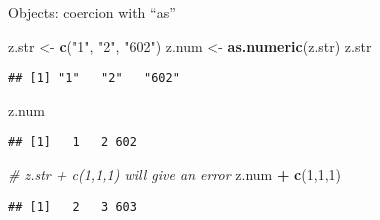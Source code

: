 \documentclass[ignorenonframetext,]{beamer}
\newenvironment{Shaded}{\begin{snugshade}}{\end{snugshade}}
\newcommand{\KeywordTok}[1]{\textcolor[rgb]{0.13,0.29,0.53}{\textbf{#1}}}
\newcommand{\DecValTok}[1]{\textcolor[rgb]{0.00,0.00,0.81}{#1}}
\newcommand{\StringTok}[1]{\textcolor[rgb]{0.31,0.60,0.02}{#1}}
\newcommand{\CommentTok}[1]{\textcolor[rgb]{0.56,0.35,0.01}{\textit{#1}}}
\newcommand{\OperatorTok}[1]{\textcolor[rgb]{0.81,0.36,0.00}{\textbf{#1}}}
\newcommand{\NormalTok}[1]{#1}
\begin{document}
\begin{frame}[fragile]{Objects: coercion with ``as''}

\begin{Shaded}
\begin{Highlighting}[]
\NormalTok{z.str <-}\StringTok{ }\KeywordTok{c}\NormalTok{(}\StringTok{"1"}\NormalTok{, }\StringTok{"2"}\NormalTok{, }\StringTok{"602"}\NormalTok{)}
\NormalTok{z.num <-}\StringTok{ }\KeywordTok{as.numeric}\NormalTok{(z.str)}
\NormalTok{z.str}
\end{Highlighting}
\end{Shaded}

\begin{verbatim}
## [1] "1"   "2"   "602"
\end{verbatim}

\begin{Shaded}
\begin{Highlighting}[]
\NormalTok{z.num}
\end{Highlighting}
\end{Shaded}

\begin{verbatim}
## [1]   1   2 602
\end{verbatim}

\begin{Shaded}
\begin{Highlighting}[]
\CommentTok{# z.str + c(1,1,1) will give an error}
\NormalTok{z.num }\OperatorTok{+}\StringTok{ }\KeywordTok{c}\NormalTok{(}\DecValTok{1}\NormalTok{,}\DecValTok{1}\NormalTok{,}\DecValTok{1}\NormalTok{)}
\end{Highlighting}
\end{Shaded}

\begin{verbatim}
## [1]   2   3 603
\end{verbatim}

\end{frame}
\end{document}

